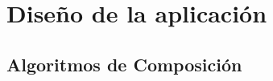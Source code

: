\chapter{Diseño de la aplicación}



\section{Algoritmos de Composición}
\label{sec:algcomp}
























